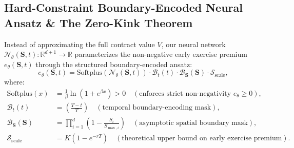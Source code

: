 \documentclass[11pt,a4paper]{article}
\begin{document}
\subsection{Hard-Constraint Boundary-Encoded Neural Ansatz \& The Zero-Kink Theorem}
Instead of approximating the full contract value $V$, our neural network $\mathcal{N}_\theta(\mathbf{S}, t): \mathbb{R}^{d+1} \to \mathbb{R}$ parameterizes the non-negative early exercise premium $e_\theta(\mathbf{S}, t)$ through the structured boundary-encoded ansatz:
\begin{equation}
\label{eq:boundary_ansatz_definition}
e_\theta(\mathbf{S}, t) = \text{Softplus}\left( \mathcal{N}_\theta(\mathbf{S}, t) \right) \cdot \mathcal{B}_t(t) \cdot \mathcal{B}_{\mathbf{S}}(\mathbf{S}) \cdot \mathcal{S}_{\text{scale}},
\end{equation}
where:
\begin{align}
\label{eq:softplus_def}
\text{Softplus}(x) &= \frac{1}{\beta}\ln\left(1 + e^{\beta x}\right) > 0 \quad (\text{enforces strict non-negativity } e_\theta \ge 0), \\
\label{eq:time_mask_def}
\mathcal{B}_t(t) &= \left( \frac{T - t}{T} \right) \quad (\text{temporal boundary-encoding mask}), \\
\label{eq:spatial_mask_def}
\mathcal{B}_{\mathbf{S}}(\mathbf{S}) &= \prod_{i=1}^d \left( 1 - \frac{S_i}{S_{\max, i}} \right) \quad (\text{asymptotic spatial boundary mask}), \\
\label{eq:scale_factor_def}
\mathcal{S}_{\text{scale}} &= K \left(1 - e^{-rT}\right) \quad (\text{theoretical upper bound on early exercise premium}).
\end{align}
\end{document}
